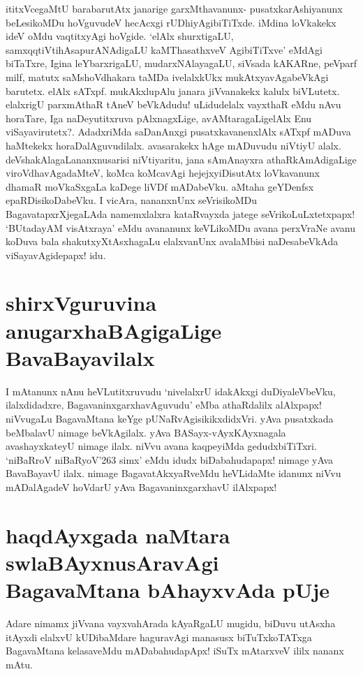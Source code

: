 ititxVcegaMtU barabarutAtx janarige garxMthavanunx- pusatxkarAshiyanunx beLesikoMDu hoVguvudeV hecAcxgi rUDhiyAgibiTiTxde. iMdina loVkakekx ideV oMdu  vaqtitxyAgi hoVgide. `elAlx shurxtigaLU, samxqqtiVtihAsapurANAdigaLU kaMThasathxveV AgibiTiTxve' eMdAgi biTaTxre, Igina leYbarxrigaLU, mudarxNAlayagaLU, siVsada kAKARne, peVparf milf, matutx saMshoVdhakara taMDa ivelalxkUkx mukAtxyavAgabeVkAgi barutetx. elAlx sATxpf. mukAkxlupAlu janara jiVvanakekx kalulx biVLutetx. elalxrigU parxmAthaR tAneV beVkAdudu! uLidudelalx vayxthaR eMdu nAvu horaTare, Iga naDeyutitxruva pAlxnagxLige, avAMtaragaLigelAlx Enu viSayavirutetx?. AdadxriMda saDanAnxgi pusatxkavanenxlAlx sATxpf mADuva haMtekekx horaDalAguvudilalx. avasarakekx hAge mADuvudu niVtiyU alalx. deVshakAlagaLananxnusarisi niVtiyaritu, jana sAmAnayxra athaRkAmAdigaLige viroVdhavAgadaMteV, koMca koMcavAgi hejejxyiDisutAtx loVkavanunx dhamaR moVkaSxgaLa kaDege liVDf mADabeVku. aMtaha geYDenfsx  epaRDisikoDabeVku. I vicAra, nananxnUnx seVrisikoMDu BagavatapxrXjegaLAda namemxlalxra kataRvayxda jatege seVrikoLuLxtetxpapx! `BUtadayAM visAtxraya'\label{115b} eMdu avananunx keVLikoMDu avana perxVraNe avanu koDuva bala shakutxyXtAsxhagaLu elalxvanUnx avalaMbisi naDesabeVkAda viSayavAgidepapx! idu.

\section*{shirxVguruvina anugarxhaBAgigaLige BavaBayavilalx}

I mAtanunx nAnu heVLutitxruvudu `nivelalxrU idakAkxgi duDiyaleVbeVku, ilalxdidadxre, BagavaninxgarxhavAguvudu' eMba athaRdalilx alAlxpapx! niVvugaLu BagavaMtana keYge pUNaRvAgisikikxdidxVri. yAva pusatxkada beMbalavU nimage beVkAgilalx. yAva BASayx-vAyxKAyxnagala avashayxkateyU nimage ilalx. niVvu avana kaqpeyiMda gedudxbiTiTxri. `niBaRroV niBaRyoV\char'263 simx'\label{115} eMdu idudx biDabahudapapx! nimage yAva BavaBayavU ilalx. nimage BagavatAkxyaRveMdu heVLidaMte idanunx niVvu mADalAgadeV hoVdarU yAva BagavaninxgarxhavU ilAlxpapx!

\section*{haqdAyxgada naMtara swlaBAyxnusAravAgi BagavaMtana bAhayxvAda pUje}

Adare nimamx jiVvana vayxvahArada kAyaRgaLU mugidu, biDuvu utAsxha itAyxdi elalxvU kUDibaMdare haguravAgi manasusx biTuTxkoTATxga BagavaMtana kelasaveMdu mADabahudapApx! iSuTx mAtarxveV ililx nananx mAtu.

